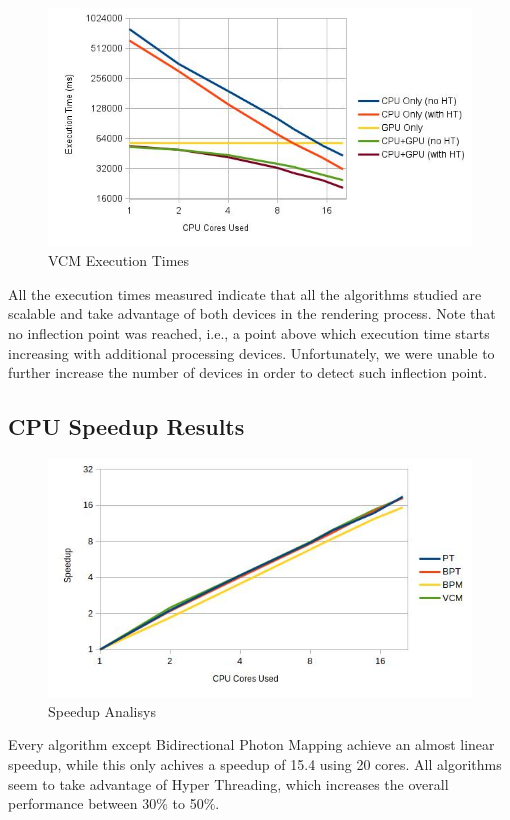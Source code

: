 \begin{figure}[H]
\centering
\includegraphics[width=0.8\linewidth]{img/vcmTexec.jpg}
\caption{\label{img:vcmTexec} VCM Execution Times}
\end{figure}

All the execution times measured indicate that all the algorithms studied are scalable and take advantage of both devices in the rendering process. Note that no inflection point was reached, i.e., a point above which execution time starts increasing with additional processing devices. Unfortunately, we were unable to further increase the number of devices in order to detect such inflection point.

\subsection{CPU Speedup Results}

\begin{figure}[H]
\centering
\includegraphics[width=0.8\linewidth]{img/speedup.jpg}
\caption{\label{img:speedup} Speedup Analisys}
\end{figure}

Every algorithm except Bidirectional Photon Mapping achieve an almost linear speedup, while this only achives a speedup of 15.4 using 20 cores. All algorithms seem to take advantage of Hyper Threading, which increases the overall performance between 30\% to 50\%.


